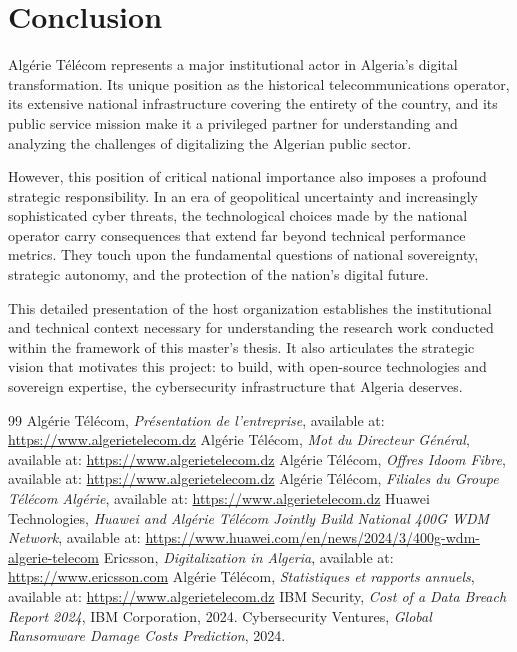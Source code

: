\section{Conclusion}
\label{sec:conclusion}

Algérie Télécom represents a major institutional actor in Algeria's digital transformation. Its unique position as the historical telecommunications operator, its extensive national infrastructure covering the entirety of the country, and its public service mission make it a privileged partner for understanding and analyzing the challenges of digitalizing the Algerian public sector.

However, this position of critical national importance also imposes a profound strategic responsibility. In an era of geopolitical uncertainty and increasingly sophisticated cyber threats, the technological choices made by the national operator carry consequences that extend far beyond technical performance metrics. They touch upon the fundamental questions of national sovereignty, strategic autonomy, and the protection of the nation's digital future.

This detailed presentation of the host organization establishes the institutional and technical context necessary for understanding the research work conducted within the framework of this master's thesis. It also articulates the strategic vision that motivates this project: to build, with open-source technologies and sovereign expertise, the cybersecurity infrastructure that Algeria deserves.

\begin{thebibliography}{99}
 Algérie Télécom, \textit{Présentation de l'entreprise}, available at: \url{https://www.algerietelecom.dz}
 Algérie Télécom, \textit{Mot du Directeur Général}, available at: \url{https://www.algerietelecom.dz}
 Algérie Télécom, \textit{Offres Idoom Fibre}, available at: \url{https://www.algerietelecom.dz}
 Algérie Télécom, \textit{Filiales du Groupe Télécom Algérie}, available at: \url{https://www.algerietelecom.dz}
 Huawei Technologies, \textit{Huawei and Algérie Télécom Jointly Build National 400G WDM Network}, available at: \url{https://www.huawei.com/en/news/2024/3/400g-wdm-algerie-telecom}
 Ericsson, \textit{Digitalization in Algeria}, available at: \url{https://www.ericsson.com}
 Algérie Télécom, \textit{Statistiques et rapports annuels}, available at: \url{https://www.algerietelecom.dz}
 IBM Security, \textit{Cost of a Data Breach Report 2024}, IBM Corporation, 2024.
 Cybersecurity Ventures, \textit{Global Ransomware Damage Costs Prediction}, 2024.
\end{thebibliography}


